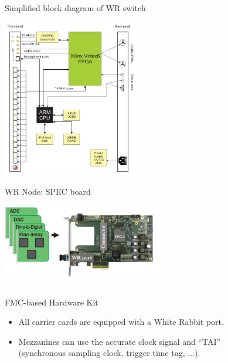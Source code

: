 \documentclass[compress, red]{beamer}
\begin{document}
\begin{frame}{Simplified block diagram of WR switch}
 \begin{center}
   \includegraphics[height=6.9cm]{../../figures/switch/switch_simple_diagram.pdf}
 \end{center} 
\end{frame}


\begin{frame}{WR Node: SPEC board}
    \begin{center}
    \includegraphics[width=7cm]{../../figures/node/spec.jpg}
    \end{center}

  \begin{columns}[c]

	\begin{block}{FMC-based Hardware Kit}
	  \begin{itemize}
	  \item All carrier cards are equipped with a White Rabbit port.
	  \item Mezzanines can use the accurate clock signal and ``TAI''
		\\ (synchronous sampling clock, trigger time tag, ...).
	  \end{itemize}
	\end{block}

  \end{columns}
\end{frame}
\end{document}
